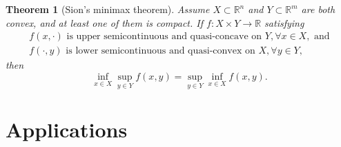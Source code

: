 \documentclass[openany]{book}
\newtheorem{theorem}{Theorem}[chapter]
\theoremstyle{definition}
\theoremstyle{remark}
\begin{document}
\begin{theorem}[Sion's minimax theorem]
    Assume $X\subset\mathbb{R}^n$ and $Y\subset\mathbb{R}^m$ are both convex, and at least one of them is compact. If $f:X\times Y\rightarrow\mathbb{R}$ satisfying
    \begin{equation*}\label{sionCond}
    \begin{array}{l}
    f(x,\cdot)\textrm{ is upper semicontinuous and quasi-concave on }Y,\forall x\in X,\textrm{ and}\\
    f(\cdot,y)\textrm{ is lower semicontinuous and quasi-convex on }X, \forall y\in Y,
    \end{array}
    \end{equation*}
    then
    \begin{equation*}\label{sionMinimax}
    \inf_{x\in X}\sup_{y\in Y}f(x,y)=\sup_{y\in Y}\inf_{x\in X}f(x,y).
    \end{equation*}
\end{theorem}

\section{Applications}
\end{document}
